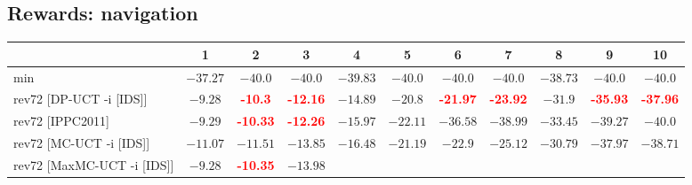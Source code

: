 \documentclass{article}
\begin{document}
\bigskip

\subsection*{Rewards: navigation}

\begin{tabular}{|l|r@{$\pm$}rr@{$\pm$}rr@{$\pm$}rr@{$\pm$}rr@{$\pm$}rr@{$\pm$}rr@{$\pm$}rr@{$\pm$}rr@{$\pm$}rr@{$\pm$}r|}
\hline

& \multicolumn{2}{c}{1}
& \multicolumn{2}{c}{2}
& \multicolumn{2}{c}{3}
& \multicolumn{2}{c}{4}
& \multicolumn{2}{c}{5}
& \multicolumn{2}{c}{6}
& \multicolumn{2}{c}{7}
& \multicolumn{2}{c}{8}
& \multicolumn{2}{c}{9}
& \multicolumn{2}{c|}{10}
\\
\hline
\hline
min
& \multicolumn{2}{c}{$-37.27$}
& \multicolumn{2}{c}{$-40.0$}
& \multicolumn{2}{c}{$-40.0$}
& \multicolumn{2}{c}{$-39.83$}
& \multicolumn{2}{c}{$-40.0$}
& \multicolumn{2}{c}{$-40.0$}
& \multicolumn{2}{c}{$-40.0$}
& \multicolumn{2}{c}{$-38.73$}
& \multicolumn{2}{c}{$-40.0$}
& \multicolumn{2}{c|}{$-40.0$}
\\
rev72 [DP-UCT -i [IDS]]
& \multicolumn{2}{c}{$-9.28$}
& \multicolumn{2}{c}{\textbf{\textcolor{red}{-10.3}}}
& \multicolumn{2}{c}{\textbf{\textcolor{red}{-12.16}}}
& \multicolumn{2}{c}{$-14.89$}
& \multicolumn{2}{c}{$-20.8$}
& \multicolumn{2}{c}{\textbf{\textcolor{red}{-21.97}}}
& \multicolumn{2}{c}{\textbf{\textcolor{red}{-23.92}}}
& \multicolumn{2}{c}{$-31.9$}
& \multicolumn{2}{c}{\textbf{\textcolor{red}{-35.93}}}
& \multicolumn{2}{c|}{\textbf{\textcolor{red}{-37.96}}}
\\
rev72 [IPPC2011]
& \multicolumn{2}{c}{$-9.29$}
& \multicolumn{2}{c}{\textbf{\textcolor{red}{-10.33}}}
& \multicolumn{2}{c}{\textbf{\textcolor{red}{-12.26}}}
& \multicolumn{2}{c}{$-15.97$}
& \multicolumn{2}{c}{$-22.11$}
& \multicolumn{2}{c}{$-36.58$}
& \multicolumn{2}{c}{$-38.99$}
& \multicolumn{2}{c}{$-33.45$}
& \multicolumn{2}{c}{$-39.27$}
& \multicolumn{2}{c|}{$-40.0$}
\\
rev72 [MC-UCT -i [IDS]]
& \multicolumn{2}{c}{$-11.07$}
& \multicolumn{2}{c}{$-11.51$}
& \multicolumn{2}{c}{$-13.85$}
& \multicolumn{2}{c}{$-16.48$}
& \multicolumn{2}{c}{$-21.19$}
& \multicolumn{2}{c}{$-22.9$}
& \multicolumn{2}{c}{$-25.12$}
& \multicolumn{2}{c}{$-30.79$}
& \multicolumn{2}{c}{$-37.97$}
& \multicolumn{2}{c|}{$-38.71$}
\\
rev72 [MaxMC-UCT -i [IDS]]
& \multicolumn{2}{c}{$-9.28$}
& \multicolumn{2}{c}{\textbf{\textcolor{red}{-10.35}}}
& \multicolumn{2}{c}{$-13.98$}

\end{tabular}
\end{document}
